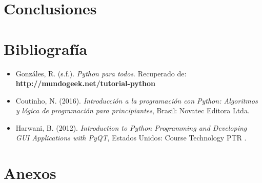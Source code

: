 \documentclass[a4paper,openright,12pt]{report}
\begin{document}
\section{Conclusiones}

\section{Bibliograf\'ia}
\begin{itemize}
	\item Gonz\'ales, R. (s.f.). \textit{Python para todos}. Recuperado de: \textbf{http://mundogeek.net/tutorial-python}
	\item Coutinho, N. (2016). \textit{Introducci\'on a la programaci\'on con Python: Algoritmos y l\'ogica de programaci\'on para principiantes}, Brasil: Novatec Editora Ltda.
	\item Harwani, B. (2012). \textit{Introduction to Python Programming and Developing GUI Applications with PyQT}, Estados Unidos: Course Technology PTR .
\end{itemize}

\section{Anexos}
\end{document}
